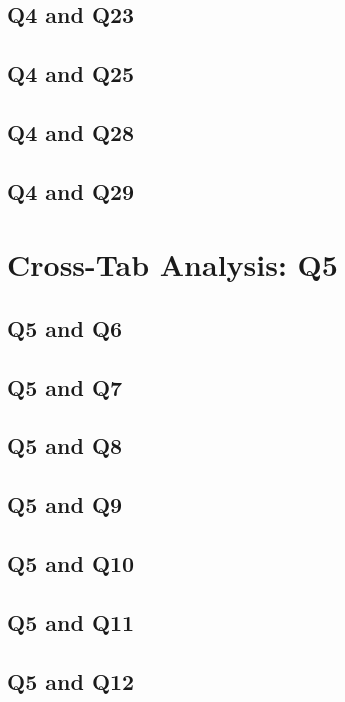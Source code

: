 \documentclass{report}
\begin{document}
\section{Q4 and Q23}\clearpage
\section{Q4 and Q25}\clearpage
\section{Q4 and Q28}\clearpage
\section{Q4 and Q29}\clearpage

\chapter{Cross-Tab Analysis: Q5}

\section{Q5 and Q6}\clearpage
\section{Q5 and Q7}\clearpage
\section{Q5 and Q8}\clearpage
\section{Q5 and Q9}\clearpage
\section{Q5 and Q10}\clearpage
\section{Q5 and Q11}\clearpage
\section{Q5 and Q12}\clearpage
\end{document}
